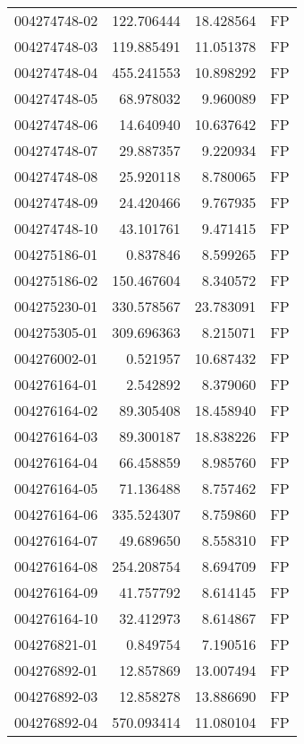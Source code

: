 \begin{tabular}{lrrl}
004274748-02 &  122.706444 &      18.428564 &   FP \\
004274748-03 &  119.885491 &      11.051378 &   FP \\
004274748-04 &  455.241553 &      10.898292 &   FP \\
004274748-05 &   68.978032 &       9.960089 &   FP \\
004274748-06 &   14.640940 &      10.637642 &   FP \\
004274748-07 &   29.887357 &       9.220934 &   FP \\
004274748-08 &   25.920118 &       8.780065 &   FP \\
004274748-09 &   24.420466 &       9.767935 &   FP \\
004274748-10 &   43.101761 &       9.471415 &   FP \\
004275186-01 &    0.837846 &       8.599265 &   FP \\
004275186-02 &  150.467604 &       8.340572 &   FP \\
004275230-01 &  330.578567 &      23.783091 &   FP \\
004275305-01 &  309.696363 &       8.215071 &   FP \\
004276002-01 &    0.521957 &      10.687432 &   FP \\
004276164-01 &    2.542892 &       8.379060 &   FP \\
004276164-02 &   89.305408 &      18.458940 &   FP \\
004276164-03 &   89.300187 &      18.838226 &   FP \\
004276164-04 &   66.458859 &       8.985760 &   FP \\
004276164-05 &   71.136488 &       8.757462 &   FP \\
004276164-06 &  335.524307 &       8.759860 &   FP \\
004276164-07 &   49.689650 &       8.558310 &   FP \\
004276164-08 &  254.208754 &       8.694709 &   FP \\
004276164-09 &   41.757792 &       8.614145 &   FP \\
004276164-10 &   32.412973 &       8.614867 &   FP \\
004276821-01 &    0.849754 &       7.190516 &   FP \\
004276892-01 &   12.857869 &      13.007494 &   FP \\
004276892-03 &   12.858278 &      13.886690 &   FP \\
004276892-04 &  570.093414 &      11.080104 &   FP \\

\end{tabular}
